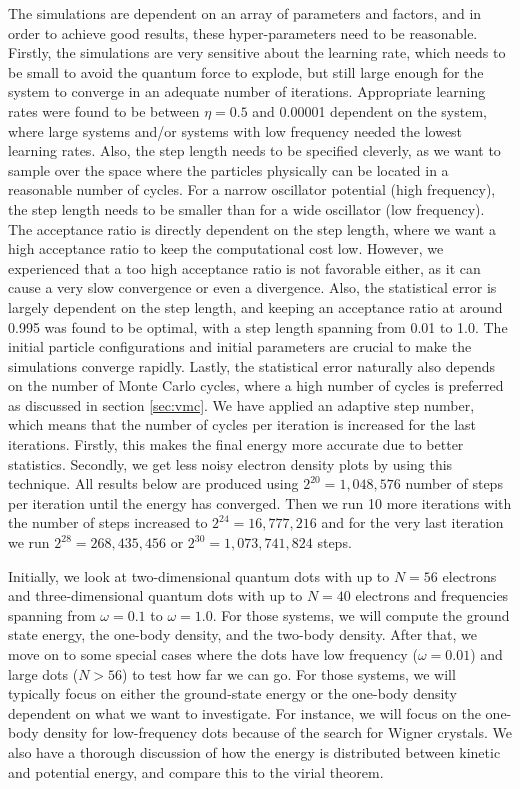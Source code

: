 The simulations are dependent on an array of parameters and factors, and in order to achieve good results, these hyper-parameters need to be reasonable. Firstly, the simulations are very sensitive about the learning rate, which needs to be small to avoid the quantum force to explode, but still large enough for the system to converge in an adequate number of iterations. Appropriate learning rates were found to be between $\eta=0.5$ and 0.00001 dependent on the system, where large systems and/or systems with low frequency needed the lowest learning rates. Also, the step length needs to be specified cleverly, as we want to sample over the space where the particles physically can be located in a reasonable number of cycles. For a narrow oscillator potential (high frequency), the step length needs to be smaller than for a wide oscillator (low frequency). The acceptance ratio is directly dependent on the step length, where we want a high acceptance ratio to keep the computational cost low. However, we experienced that a too high acceptance ratio is not favorable either, as it can cause a very slow convergence or even a divergence. Also, the statistical error is largely dependent on the step length, and keeping an acceptance ratio at around 0.995 was found to be optimal, with a step length spanning from 0.01 to 1.0. The initial particle configurations and initial parameters are crucial to make the simulations converge rapidly. Lastly, the statistical error naturally also depends on the number of Monte Carlo cycles, where a high number of cycles is preferred as discussed in section \ref{sec:vmc}. We have applied an adaptive step number, which means that the number of cycles per iteration is increased for the last iterations. Firstly, this makes the final energy more accurate due to better statistics. Secondly, we get less noisy electron density plots by using this technique. All results below are produced using $2^{20}=1,048,576$ number of steps per iteration until the energy has converged. Then we run 10 more iterations with the number of steps increased to $2^{24}=16,777,216$ and for the very last iteration we run $2^{28}=268,435,456$ or $2^{30}=1,073,741,824$ steps.

Initially, we look at two-dimensional quantum dots with up to $N=56$ electrons and three-dimensional quantum dots with up to $N=40$ electrons and frequencies spanning from  $\omega=0.1$ to $\omega=1.0$. For those systems, we will compute the ground state energy, the one-body density, and the two-body density. After that, we move on to some special cases where the dots have low frequency ($\omega=0.01$) and large dots ($N>56$) to test how far we can go. For those systems, we will typically focus on either the ground-state energy or the one-body density dependent on what we want to investigate. For instance, we will focus on the one-body density for low-frequency dots because of the search for Wigner crystals. We also have a thorough discussion of how the energy is distributed between kinetic and potential energy, and compare this to the virial theorem.

